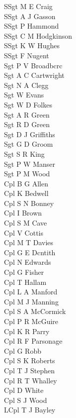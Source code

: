 \begin{multicols}{4}
  \scriptsize
  \noindent
  SSgt M E Craig \\
  SSgt A J Gasson \\
  SSgt P Hammond \\
  SSgt C M Hodgkinson \\
  SSgt K W Hughes \\
  SSgt F Nugent \\
  Sgt P V Broadbcrc \\
  Sgt A C Cartwright \\
  Sgt N A Clegg \\
  Sgt W Evans \\
  Sgt W D Folkes \\
  Sgt A R Green \\
  Sgt R D Green \\
  Sgt D J Griffiths \\
  Sgt G D Groom \\
  Sgt S R King \\
  Sgt P W Manser \\
  Sgt P M Wood \\
  Cpl B G Allen \\
  Cpl K Bedwell \\
  Cpl S N Bonney \\
  Cpl I Brown \\
  Cpl S M Cave \\
  Cpl V Cottis \\
  Cpl M T Davies \\
  Cpl G E Dcntith \\
  Cpl N Edwards \\
  Cpl G Fisher \\
  Cpl T Hallam \\
  Cpl L A Manford \\
  Cpl M J Manning \\
  Cpl S A McCormick \\
  Cpl P R McGuire \\
  Cpl K R Parry \\
  Cpl R F Parsonage \\
  Cpl G Robb \\
  Cpl S K Roberts \\
  Cpl T J Stephen \\
  Cpl R T Whalley \\
  Cpl D White \\
  Cpl S J Wood \\
  LCpl T J Bayley \\

\end{multicols}
